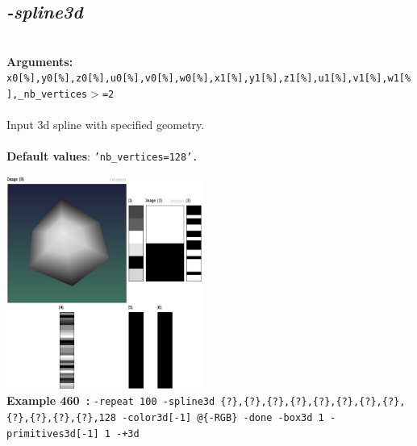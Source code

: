 \documentclass[a4paper,11pt,twoside]{book}
\begin{document}
\subsection{\emph{-spline3d} }\vspace*{-0.5em}
~\\\textbf{Arguments: } 
{\small \texttt{x0[\%],y0[\%],z0[\%],u0[\%],v0[\%],w0[\%],x1[\%],y1[\%],z1[\%],u1[\%],v1[\%],w1[\%],\_nb\_vertices$>$=2}}\\~\\
Input 3d spline with specified geometry.
~\\~\\\textbf{Default values}: {\small \texttt{'nb\_vertices=128'.}}
\begin{center}\includegraphics[keepaspectratio=true,height=7cm,width=\textwidth]{img/gmic_def460.jpg}\\
{\footnotesize \textbf{Example 460~:} \texttt{-repeat 100 -spline3d \{?\},\{?\},\{?\},\{?\},\{?\},\{?\},\{?\},\{?\},\{?\},\{?\},\{?\},\{?\},128 -color3d[-1] @\{-RGB\} -done -box3d 1 -primitives3d[-1] 1 -+3d}}
\end{center}
\end{document}
